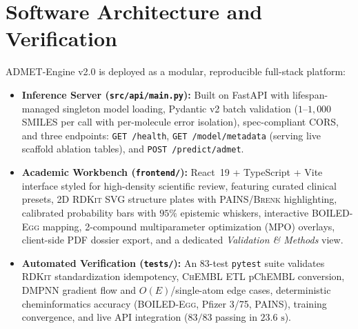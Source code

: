 \documentclass[10pt,twocolumn,letterpaper]{article}
\begin{document}
\section{Software Architecture and Verification}
ADMET-Engine v2.0 is deployed as a modular, reproducible full-stack platform:
\begin{itemize}
  \item \textbf{Inference Server (\texttt{src/api/main.py}):} Built on FastAPI with lifespan-managed singleton model loading, Pydantic v2 batch validation ($1$–$1{,}000$ \textsc{SMILES} per call with per-molecule error isolation), spec-compliant \textsc{CORS}, and three endpoints: \texttt{GET /health}, \texttt{GET /model/metadata} (serving live scaffold ablation tables), and \texttt{POST /predict/admet}.
  \item \textbf{Academic Workbench (\texttt{frontend/}):} React~19 + TypeScript + Vite interface styled for high-density scientific review, featuring curated clinical presets, 2D \textsc{RDKit} \textsc{SVG} structure plates with \textsc{PAINS}/\textsc{Brenk} highlighting, calibrated probability bars with $95\%$ epistemic whiskers, interactive \textsc{BOILED-Egg} mapping, 2-compound multiparameter optimization (\textsc{MPO}) overlays, client-side \textsc{PDF} dossier export, and a dedicated \textit{Validation \& Methods} view.
  \item \textbf{Automated Verification (\texttt{tests/}):} An $83$-test \texttt{pytest} suite validates \textsc{RDKit} standardization idempotency, \textsc{ChEMBL} \textsc{ETL} pChEMBL conversion, \textsc{DMPNN} gradient flow and $O(E)$/single-atom edge cases, deterministic cheminformatics accuracy (\textsc{BOILED-Egg}, Pfizer 3/75, \textsc{PAINS}), training convergence, and live \textsc{API} integration ($83/83$ passing in $23.6\text{ s}$).
\end{itemize}

\end{document}
